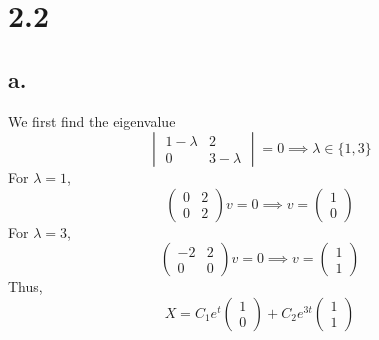 \documentclass[11pt]{article}
\theoremstyle{mystyle}
\theoremstyle{definition}
\begin{document}
\section*{2.2}
\subsection*{a.}
We first find the eigenvalue 
\[
  \begin{vmatrix}
    1 - \lambda & 2 \\
    0 & 3 - \lambda
  \end{vmatrix}
  = 0 \implies \lambda \in \{1,3\} 
\]
For $\lambda = 1$, 
\[
  \begin{pmatrix}
    0 & 2 \\
    0 & 2
  \end{pmatrix}
  v
  = 0 \implies
  v = 
  \begin{pmatrix}
    1 \\
    0
  \end{pmatrix}
\]
For $\lambda = 3$, 
\[
  \begin{pmatrix}
    -2 & 2 \\
    0 & 0
  \end{pmatrix}
  v
  = 0 \implies
  v = 
  \begin{pmatrix}
    1 \\
    1
  \end{pmatrix}
\]
Thus, 
\[
  X = C_1e^t 
  \begin{pmatrix}
    1 \\
    0
  \end{pmatrix}
  + C_2e^{3t} 
  \begin{pmatrix}
    1 \\
    1
  \end{pmatrix}
\]
\end{document}
